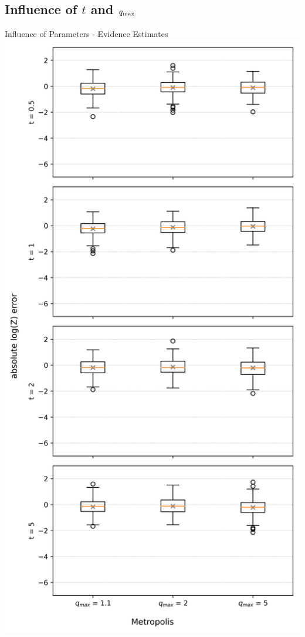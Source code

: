 \documentclass[]{beamer}
\begin{document}
  \subsection*{Influence of $t$ and $q_{\textnormal{max}}$}
  \begin{frame}{Influence of Parameters - Evidence Estimates}
    \centering
    \includegraphics[scale=0.25]{figs/results/params/logZ_diffs_metropolis.png}

\end{frame}
\end{document}
